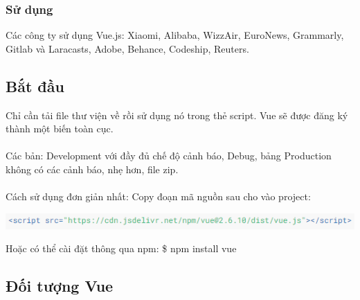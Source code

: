 \documentclass[12pt,a4paper]{report}
\begin{document}
\subsubsection{Sử dụng}
Các công ty sử dụng Vue.js: Xiaomi, Alibaba, WizzAir, EuroNews, Grammarly, Gitlab và Laracasts, Adobe, Behance, Codeship, Reuters.

\subsection{Bắt đầu}
Chỉ cần tải file thư viện về rồi sử dụng nó trong thẻ script. Vue sẽ được đăng ký thành một biến toàn cục.\\\\
Các bản: Development với đầy đủ chế độ cảnh báo, Debug, bảng Production không có các cảnh báo, nhẹ hơn, file zip.\\\\
Cách sử dụng đơn giản nhất: Copy đoạn mã nguồn sau cho vào project:
\begin{center}
	\includegraphics[scale=.8]{6}
\end{center}
Hoặc có thể cài đặt thông qua npm: \$ npm install vue
\subsection{Đối tượng Vue}
\end{document}
